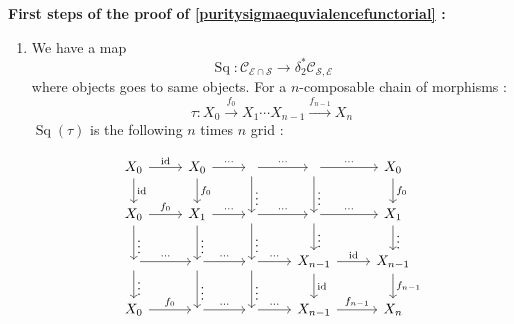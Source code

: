 \documentclass[14pt]{article}
\theoremstyle{definition}
\newcommand{\E}{\mathcal{E}}
\newcommand{\op}[1]{\operatorname{#1}}
\newcommand{\dd}{\delta}
\newcommand{\Ca}{\mathcal{C}}
\numberwithin{subsection}{section}
\begin{document}
\textbf{First steps of the proof of \cref{puritysigmaequvialencefunctorial} :}
\begin{enumerate}
    \item We have a map 
    \begin{equation}
        \op{Sq}:\Ca_{\E \cap \mathcal{S}} \to \dd^*_2\Ca_{\mathcal{S},\E}
    \end{equation}
    where objects goes to same objects. For a $n$-composable chain of morphisms :
    \begin{equation}
      \tau:  X_0 \xrightarrow{f_0} X_1 \cdots X_{n-1} \xrightarrow{f_{n-1}} X_n
    \end{equation}
$\op{Sq}(\tau)$ is the following $n$ times $n$ grid :

\begin{equation}
    \begin{tikzcd}
        X_0 \arrow[r, "\op{id}"] \arrow[d,"\op{id}"] & X_0 \arrow[d,"f_0"] \arrow[r,"\cdots"] & 
       {} \arrow[r,"\cdots"] \arrow[d,"\vdots"]  &\arrow[r,"\cdots"] \arrow[d,"\vdots"] & X_0 \arrow[d,"f_0"] \\
        X_0 \arrow[d,"\vdots"] \arrow[r,"f_0"] & X_1 \arrow[r,"\cdots"]\arrow[d,"\vdots"] & {} \arrow[d,"\vdots"] \arrow[r,"\cdots"]&{} \arrow[d,"\vdots"] \arrow[r,"\cdots"] & X_1 \arrow[d,"\vdots"] \\
        {} \arrow[d,"\vdots"] \arrow[r,"\cdots"] & {} \arrow[d,"\vdots"] \arrow[r,"\cdots"] & {} \arrow[r,"\cdots"] \arrow[d,"\vdots"] & X_{n-1} \arrow[d,"\op{id}"] \arrow[r,"\op{id}"] & X_{n-1} \arrow[d,"f_{n-1}"] \\
        X_0 \arrow[r,"f_0"] & {} \arrow[r,"\cdots"] & {} \arrow[r,"\cdots"] & X_{n-1} \arrow[r,"f_{n-1}"] & X_n
    \end{tikzcd}
\end{equation}


\end{enumerate}
\end{document}
